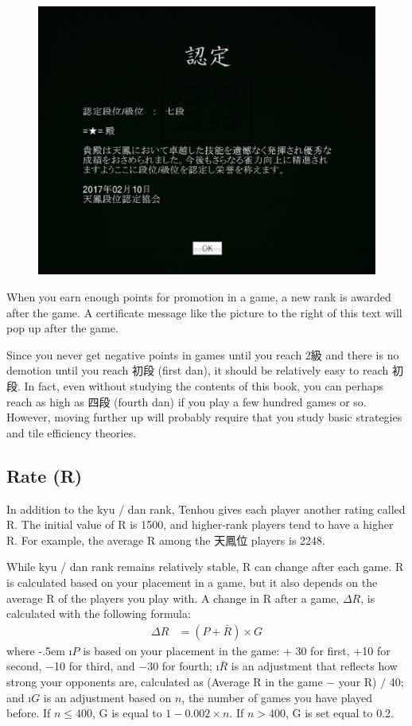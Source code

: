 \bigskip
\begin{figure}
\vspace{-30pt}
\begin{center}
\includegraphics[width=.45\textwidth,clip]{figs/7dan}
\end{center}
\vspace{-25pt}
\end{figure}
When you earn enough points for promotion in a game, a new rank is awarded after the game. A certificate message like the picture to the right of this text will pop up after the game.

\bigskip
Since you never get negative points in games until you reach 2級 and there is no demotion until you reach 初段 (first {\jap dan}), it should be relatively easy to reach 初段. In fact, even without studying the contents of this book, you can perhaps reach as high as 四段 (fourth {\jap dan}) if you play a few hundred games or so. However, moving further up will probably require that you study basic strategies and tile efficiency theories.

\subsection{Rate (R)}

In addition to the {\jap kyu / dan} rank, {\jap Tenhou} gives each player another rating called R. The initial value of R is 1500, and higher-rank players tend to have a higher R. For example, the average R among the 天鳳位 players is 2248.%

\bigskip
While {\jap kyu / dan} rank remains relatively stable, R can change after each game. R is calculated based on your placement in a game, but it also depends on the average R of the players you play with.
A change in R after a game, $\Delta R$, is calculated with the following formula:
\begin{align*}
\Delta R &= (P + \bar{R}) \times G
\end{align*}
where
\bi \itemsep-.5em
\i $P$ is based on your placement in the game: + 30 for first, +10 for second, $-$10 for third, and $-$30 for fourth;
\i $\bar{R}$ is an adjustment that reflects how strong your opponents are, calculated as (Average R in the game $-$ your R) $/$ 40; and
\i $G$ is an adjustment based on $n$, the number of games you have played before. If $n \leq 400$, G is equal to $1-0.002 \times n$. If $n > 400$, G is set equal to 0.2.
\ei

